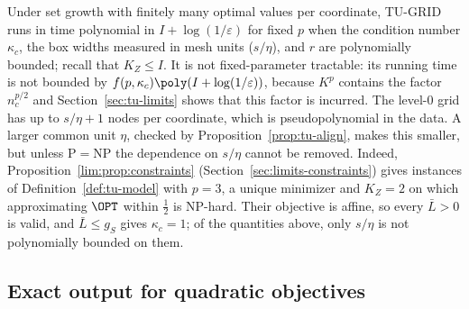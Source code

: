 Under set growth with finitely many optimal values per coordinate, TU-GRID
runs in time polynomial in $I+\log(1/\varepsilon)$ for fixed $p$ when the
condition number $\kappa_c$, the box widths measured in mesh units
($s/\eta$), and $r$ are polynomially bounded; recall that $K_Z\le I$. It is
not fixed-parameter tractable: its running time is not bounded by
$f(p,\kappa_c)\poly(I+\log(1/\varepsilon))$, because $K^p$ contains the
factor $n_c^{p/2}$ and Section~\ref{sec:tu-limits} shows that this factor is
incurred. The level-$0$ grid has up to $s/\eta+1$ nodes per coordinate, which
is pseudopolynomial in the data. A larger common unit $\eta$, checked by
Proposition~\ref{prop:tu-align}, makes this smaller, but unless
$\mathrm P=\mathrm{NP}$ the dependence on $s/\eta$ cannot be removed.
Indeed, Proposition~\ref{lim:prop:constraints}
(Section~\ref{sec:limits-constraints}) gives instances of
Definition~\ref{def:tu-model} with $p=3$, a unique minimizer and $K_Z=2$ on
which approximating $\OPT$ within $\frac12$ is NP-hard. Their objective is
affine, so every $\bar L>0$ is valid, and $\bar L\le g_S$ gives
$\kappa_c=1$; of the quantities above, only $s/\eta$ is not polynomially
bounded on them.

\subsection{Exact output for quadratic objectives}\label{sec:tu-exact}

